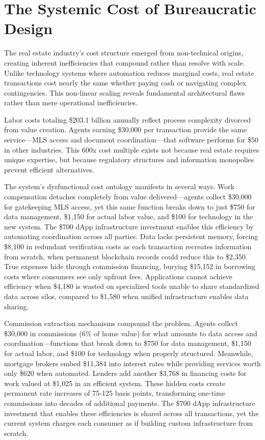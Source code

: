 \section{The Systemic Cost of Bureaucratic Design}

The real estate industry's cost structure emerged from non-technical origins, creating inherent inefficiencies that compound rather than resolve with scale. Unlike technology systems where automation reduces marginal costs, real estate transactions cost nearly the same whether paying cash or navigating complex contingencies. This non-linear scaling reveals fundamental architectural flaws rather than mere operational inefficiencies.

Labor costs totaling \$203.1 billion annually reflect process complexity divorced from value creation. Agents earning \$30{,}000 per transaction provide the same service—MLS access and document coordination—that software performs for \$50 in other industries. This 600x cost multiple exists not because real estate requires unique expertise, but because regulatory structures and information monopolies prevent efficient alternatives.

The system's dysfunctional cost ontology manifests in several ways. Work compensation detaches completely from value delivered—agents collect \$30{,}000 for gatekeeping MLS access, yet this same function breaks down to just \$750 for data management, \$1{,}150 for actual labor value, and \$100 for technology in the new system. The \$700 dApp infrastructure investment enables this efficiency by automating coordination across all parties. Data lacks persistent memory, forcing \$8{,}100 in redundant verification costs as each transaction recreates information from scratch, when permanent blockchain records could reduce this to \$2{,}350. True expenses hide through commission financing, burying \$15{,}152 in borrowing costs where consumers see only upfront fees. Applications cannot achieve efficiency when \$4{,}180 is wasted on specialized tools unable to share standardized data across silos, compared to \$1{,}580 when unified infrastructure enables data sharing.

Commission extraction mechanisms compound the problem. Agents collect \$30{,}000 in commissions (6\% of home value) for what amounts to data access and coordination—functions that break down to \$750 for data management, \$1{,}150 for actual labor, and \$100 for technology when properly structured. Meanwhile, mortgage brokers embed \$11{,}384 into interest rates while providing services worth only \$620 when automated. Lenders add another \$3{,}768 in financing costs for work valued at \$1{,}025 in an efficient system. These hidden costs create permanent rate increases of 75-125 basis points, transforming one-time commissions into decades of additional payments. The \$700 dApp infrastructure investment that enables these efficiencies is shared across all transactions, yet the current system charges each consumer as if building custom infrastructure from scratch.

